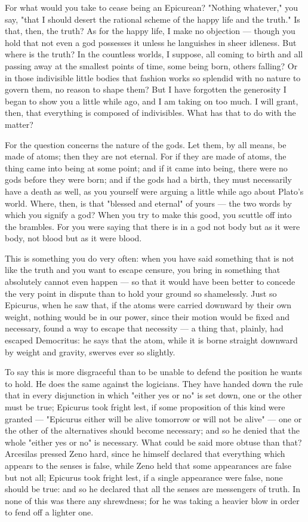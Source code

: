  For what would you take to cease being an Epicurean? "Nothing whatever," you say, "that I should desert the rational scheme of the happy life and the truth." Is that, then, the truth? As for the happy life, I make no objection — though you hold that not even a god possesses it unless he languishes in sheer idleness. But where is the truth? In the countless worlds, I suppose, all coming to birth and all passing away at the smallest points of time, some being born, others falling? Or in those indivisible little bodies that fashion works so splendid with no nature to govern them, no reason to shape them? But I have forgotten the generosity I began to show you a little while ago, and I am taking on too much. I will grant, then, that everything is composed of indivisibles. What has that to do with the matter?

 For the question concerns the nature of the gods. Let them, by all means, be made of atoms; then they are not eternal. For if they are made of atoms, the thing came into being at some point; and if it came into being, there were no gods before they were born; and if the gods had a birth, they must necessarily have a death as well, as you yourself were arguing a little while ago about Plato's world. Where, then, is that "blessed and eternal" of yours — the two words by which you signify a god? When you try to make this good, you scuttle off into the brambles. For you were saying that there is in a god not body but as it were body, not blood but as it were blood.

 This is something you do very often: when you have said something that is not like the truth and you want to escape censure, you bring in something that absolutely cannot even happen — so that it would have been better to concede the very point in dispute than to hold your ground so shamelessly. Just so Epicurus, when he saw that, if the atoms were carried downward by their own weight, nothing would be in our power, since their motion would be fixed and necessary, found a way to escape that necessity — a thing that, plainly, had escaped Democritus: he says that the atom, while it is borne straight downward by weight and gravity, swerves ever so slightly.

 To say this is more disgraceful than to be unable to defend the position he wants to hold. He does the same against the logicians. They have handed down the rule that in every disjunction in which "either yes or no" is set down, one or the other must be true; Epicurus took fright lest, if some proposition of this kind were granted — "Epicurus either will be alive tomorrow or will not be alive" — one or the other of the alternatives should become necessary; and so he denied that the whole "either yes or no" is necessary. What could be said more obtuse than that? Arcesilas pressed Zeno hard, since he himself declared that everything which appears to the senses is false, while Zeno held that some appearances are false but not all; Epicurus took fright lest, if a single appearance were false, none should be true: and so he declared that all the senses are messengers of truth. In none of this was there any shrewdness; for he was taking a heavier blow in order to fend off a lighter one.

